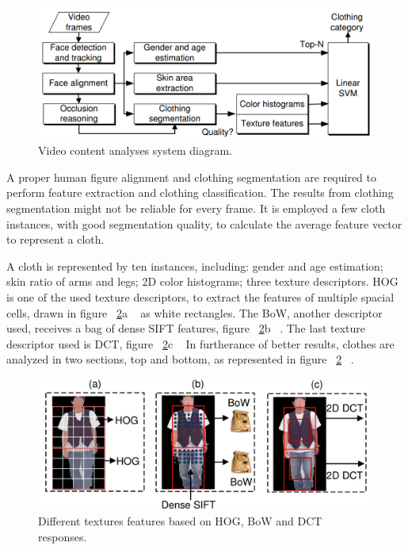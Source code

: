 \documentclass[titlepage,12pt,a4paper,times]{book}
\begin{document}
\begin{figure}[!h]
\centering
\includegraphics[scale=0.5]{images/Clothing_Diagram_1.png}
\caption{Video content analyses system diagram.}
\label{fig:vcasd}
\end{figure}
\FloatBarrier

A proper human figure alignment and clothing segmentation are required to
perform feature extraction and clothing classification. The results from
clothing segmentation might not be reliable for every frame. It is employed a
few cloth instances, with good segmentation quality, to calculate the average
feature vector to represent a cloth.

A cloth is represented by ten instances, including: gender and age estimation;
skin ratio of arms and legs; 2D color histograms; three texture descriptors.
\ac{HOG} is one of the used texture descriptors, to extract the features of
multiple spacial cells, drawn in figure ~\ref{fig:dtf}a ~\citep{1} as white
rectangles. The \ac{BoW}, another descriptor used, receives a bag of dense
\ac{SIFT} features, figure ~\ref{fig:dtf}b ~\citep{1}. The last texture
descriptor used is \ac{DCT}, figure ~\ref{fig:dtf}c ~\citep{1} In furtherance
of better results, clothes are analyzed in two sections, top and bottom, as
represented in figure ~\ref{fig:dtf} ~\citep{1}.

\begin{figure}[!h]
\centering
\includegraphics[scale=0.4]{images/top_bottom.jpg}
\caption{Different textures features based on \ac{HOG}, \ac{BoW} and
\acs{DCT} responses.}
\label{fig:dtf}
\end{figure}
\FloatBarrier
\end{document}
